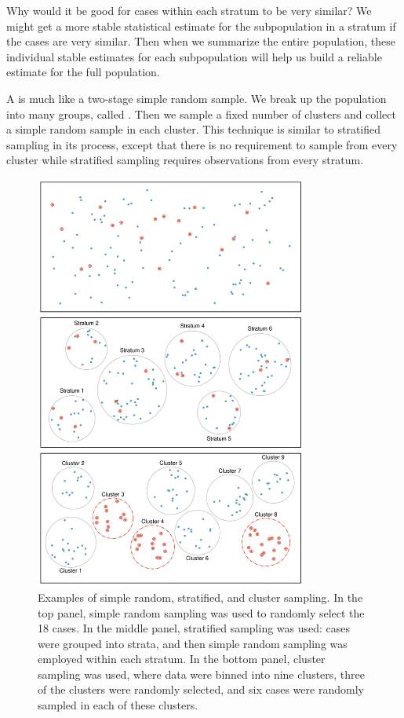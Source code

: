 \begin{example}{Why would it be good for cases within each stratum to be very similar?}
We might get a more stable statistical estimate for the subpopulation in a stratum if the cases are very similar. Then when we summarize the entire population, these individual stable estimates for each subpopulation will help us build a reliable estimate for the full population.
\end{example}

A  is much like a two-stage simple random sample. We break up the population into many groups, called . Then we sample a fixed number of clusters and collect a simple random sample in each cluster. This technique is similar to stratified sampling in its process, except that there is no requirement to sample from every cluster while stratified sampling requires observations from every stratum.
\begin{figure}
\centering
\includegraphics[width=0.8\textwidth]{01/figures/samplingMethodsFigure/samplingMethodsFigure}
\caption{Examples of simple random, stratified, and cluster sampling. In the top panel, simple random sampling was used to randomly select the 18 cases. In the middle panel, stratified sampling was used: cases were grouped into strata, and then simple random sampling was employed within each stratum. In the bottom panel, cluster sampling was used, where data were binned into nine clusters, three of the clusters were randomly selected, and six cases were randomly sampled in each of these clusters.}
\label{samplingMethodsFigure}
\end{figure}

